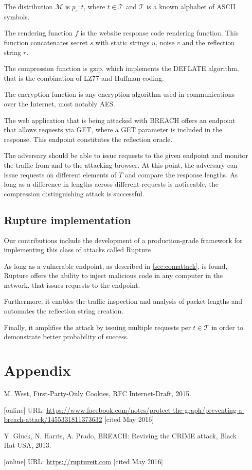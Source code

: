 \documentclass{sig-alternate-05-2015}
\begin{document}
The distribution $\mathcal{M}$ is ${p_s:t}$, where $t \in \mathcal{T}$ and
$\mathcal{T}$ is a known alphabet of ASCII symbols.

The rendering function $f$ is the website response code rendering function. This
function concatenates secret $s$ with static strings $u$, noise $v$ and the
reflection string $r$.

The compression function is gzip, which implements the DEFLATE algorithm, that
is the combination of LZ77 and Huffman coding.

The encryption function is any encryption algorithm used in communications over
the Internet, most notably AES.

The web application that is being attacked with BREACH offers an endpoint that
allows requests via GET, where a GET parameter is included in the response. This
endpoint constitutes the reflection oracle.

The adversary should be able to issue requests to the given endpoint and monitor
the traffic from and to the attacking browser. At this point, the adversary can
issue requests on different elements of $T$ and compare the response lengths. As
long as a difference in lengths across different requests is noticeable, the
compression distinguishing attack is successful.

\subsection{Rupture implementation}\label{subsec:rupture}
Our contributions include the development of a production-grade framework for
implementing this class of attacks called Rupture \cite{c4}.

As long as a vulnerable endpoint, as described in \ref{sec:comattack}, is found,
Rupture offers the ability to inject malicious code in any computer in the
network, that issues requests to the endpoint.

Furthermore, it enables the traffic inspection and analysis of packet lengths
and automates the reflection string creation.

Finally, it amplifies the attack by issuing multiple requests per $t \in
\mathcal{T}$ in order to demonstrate better probability of success.

\section{Appendix}

\begin{thebibliography}{4}

 M. West, First-Party-Only Cookies, RFC Internet-Draft, 2015.

 [online] URL:
\url{https://www.facebook.com/notes/protect-the-graph/preventing-a-breach-attack/1455331811373632}
[cited May 2016]

 Y. Gluck, N. Harris, A. Prado, BREACH: Reviving the CRIME attack,
Black Hat USA, 2013.

 [online] URL: \url{https://ruptureit.com} [cited May 2016]

\end{thebibliography}
\end{document}
